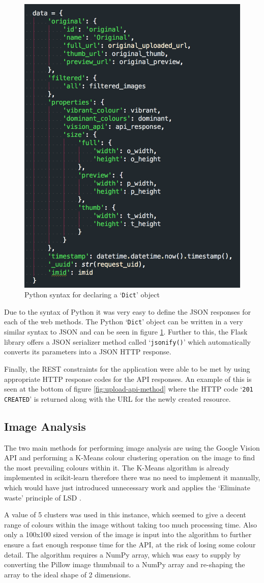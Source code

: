\documentclass[a4paper,12pt]{report}
\begin{document}
      \begin{figure}[h]
        \centering
        \includegraphics[width=0.4\linewidth]{python-json-dict}
        \caption{Python syntax for declaring a ‘\texttt{Dict}’ object}
        \label{fig:python-json-dict}
      \end{figure}

      Due to the syntax of Python it was very easy to define the JSON responses for each of the web methods. The Python ‘\texttt{Dict}’ object can be written in a very similar syntax to JSON and can be seen in figure \ref{fig:python-json-dict}. Further to this, the Flask library offers a JSON serializer method called ‘\texttt{jsonify()}’ which automatically converts its parameters into a JSON HTTP response.

      Finally, the REST constraints for the application were able to be met by using appropriate HTTP response codes for the API responses. An example of this is seen at the bottom of figure \ref{fig:upload-api-method} where the HTTP code ‘\texttt{201 CREATED}’ is returned along with the URL for the newly created resource.

    \subsection{Image Analysis}
      The two main methods for performing image analysis are using the Google Vision API and performing a K-Means colour clustering operation on the image to find the most prevailing colours within it. The K-Means algorithm is already implemented in scikit-learn therefore there was no need to implement it manually, which would have just introduced unnecessary work and applies the ‘Eliminate waste’ principle of LSD \citep{poppendieck2003lean}.

      A value of 5 clusters was used in this instance, which seemed to give a decent range of colours within the image without taking too much processing time. Also only a 100x100 sized version of the image is input into the algorithm to further ensure a fast enough response time for the API, at the risk of losing some colour detail. The algorithm requires a NumPy array, which was easy to supply by converting the Pillow image thumbnail to a NumPy array and re-shaping the array to the ideal shape of 2 dimensions.
\end{document}
